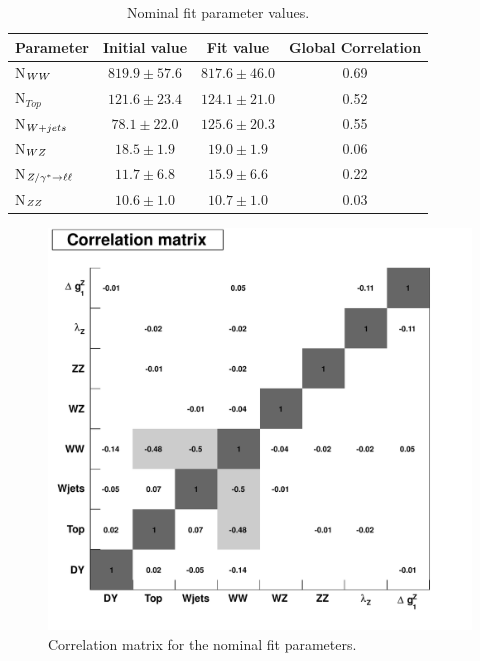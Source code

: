 \begin{table}[!ht]
  \begin{center}
 {\small
  \begin{tabular} {|l|c|c|c|}
\hline
  Parameter       &   Initial value & Fit value & Global Correlation \\
\hline
  N$_{WW}$       & $819.9\pm57.6$  & $817.6\pm46.0$ & 0.69 \\
  N$_{Top}$       & $121.6\pm23.4$  & $124.1\pm21.0$ & 0.52 \\
  N$_{W+jets}$    & $78.1\pm22.0$   & $125.6\pm20.3$ & 0.55 \\
  N$_{WZ}$       & $18.5\pm1.9$    & $19.0\pm1.9$   & 0.06 \\
  N$_{Z/\gamma^*\to\ell\ell}$     & $11.7\pm6.8$    & $15.9\pm6.6$   & 0.22 \\
  N$_{ZZ}$       & $10.6\pm1.0$    & $10.7\pm1.0$   & 0.03 \\
\hline
  \end{tabular}
  }
  \caption{Nominal fit parameter values.}
   \label{tab:fit_yields}
  \end{center}
\end{table}

\begin{figure}[tp]
  \centerline{
    \includegraphics[width=.45\textwidth]{figures/correlations}
  }

  \caption[Fit parameter correlations] {Correlation matrix for the nominal fit parameters.}
  \label{fig:fit_correlations}
\end{figure}
